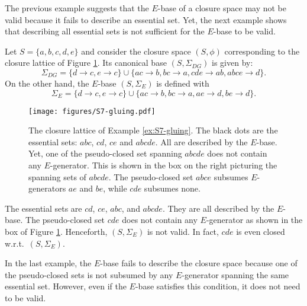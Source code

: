 \documentclass[12pt, a4paper]{article}
\def\FIGSgluing{1.05}  %
\newcommand{\U}{S}  %
\newcommand{\cl}{\phi}  %
\newcommand{\imp}{\rightarrow}  %
\newcommand{\is}{\Sigma}  %
\newcommand{\ka}[1]{\textcolor{magenta}{KA: \em #1}}
\begin{document}
The previous example suggests that the $E$-base of a closure space may not be valid because it fails to describe an essential set.
Yet, the next example shows that describing all essential sets is not sufficient for the $E$-base to be valid. 

\begin{example} \label{ex:S7-gluing}
Let $\U = \{a, b, c, d, e\}$ and consider the closure space $(\U, \cl)$ corresponding to the closure lattice of Figure \ref{fig:S7-gluing}.
Its canonical base $(\U, \is_{DG})$ is given by:
%
\[ 
\is_{DG} = \{d \imp c, e \imp c\} \cup \{ac \imp b, bc \imp a, cde \imp ab, abce \imp d\}. 
\]
%
On the other hand, the $E$-base $(\U, \is_E)$ is defined with 
\[ 
\is_E = \{d \imp c, e \imp c\} \cup \{ac \imp b, bc \imp a, ae \imp d, be \imp d\}.
\]
%
\begin{figure}[ht!]
\centering
\texttt{[image: figures/S7-gluing.pdf]}
\caption{The closure lattice of Example \ref{ex:S7-gluing}. 
The black dots are the essential sets: $abc$, $cd$, $ce$ and $abcde$.
All are described by the $E$-base. 
Yet, one of the pseudo-closed set spanning $abcde$ does not contain any $E$-generator.
This is shown in the box on the right picturing the spanning sets of $abcde$.
The pseudo-closed set $abce$ subsumes $E$-generators $ae$ and $be$, while $cde$ subsumes none.}%

\label{fig:S7-gluing}
\end{figure}
%
The essential sets are $cd$, $ce$, $abc$, and $abcde$.
They are all described by the $E$-base.
The pseudo-closed set $cde$ does not contain any $E$-generator as shown in the box of Figure \ref{fig:S7-gluing}.
Henceforth, $(\U, \is_E)$ is not valid.
In fact, $cde$ is even closed w.r.t.~$(\U, \is_E)$.
\end{example}

In the last example, the $E$-base fails to describe the closure space because one of the pseudo-closed sets is not subsumed by any $E$-generator spanning the same essential set.
However, even if the $E$-base satisfies this condition, it does not need to be valid.
\end{document}
